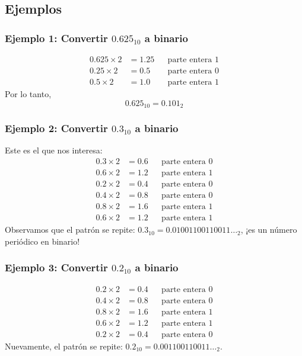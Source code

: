 \documentclass[12pt,letterpaper]{article}
\begin{document}
\subsection*{Ejemplos}

\subsubsection*{Ejemplo 1: Convertir $0.625_{10}$ a binario}
\begin{align*}
    0.625 \times 2 &= 1.25 && \text{parte entera } 1 \\
    0.25 \times 2  &= 0.5  && \text{parte entera } 0 \\
    0.5 \times 2   &= 1.0  && \text{parte entera } 1
\end{align*}
Por lo tanto,
\[
0.625_{10} = 0.101_2
\]

\subsubsection*{Ejemplo 2: Convertir $0.3_{10}$ a binario}
Este es el que nos interesa:
\begin{align*}
    0.3 \times 2 &= 0.6 && \text{parte entera } 0 \\
    0.6 \times 2 &= 1.2 && \text{parte entera } 1 \\
    0.2 \times 2 &= 0.4 && \text{parte entera } 0 \\
    0.4 \times 2 &= 0.8 && \text{parte entera } 0 \\
    0.8 \times 2 &= 1.6 && \text{parte entera } 1 \\
    0.6 \times 2 &= 1.2 && \text{parte entera } 1
\end{align*}
Observamos que el patrón se repite: $0.3_{10} = 0.01001100110011\ldots_2$, ¡es un número periódico en binario!

\subsubsection*{Ejemplo 3: Convertir $0.2_{10}$ a binario}
\begin{align*}
    0.2 \times 2 &= 0.4 && \text{parte entera } 0 \\
    0.4 \times 2 &= 0.8 && \text{parte entera } 0 \\
    0.8 \times 2 &= 1.6 && \text{parte entera } 1 \\
    0.6 \times 2 &= 1.2 && \text{parte entera } 1 \\
    0.2 \times 2 &= 0.4 && \text{parte entera } 0
\end{align*}
Nuevamente, el patrón se repite: $0.2_{10} = 0.001100110011\ldots_2$. 
\end{document}
